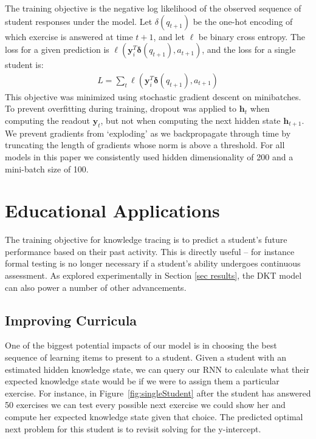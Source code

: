 \documentclass{article} \usepackage{nips,times}
\newcommand{\mb}{\mathbf}
\begin{document}
The training objective is the negative log likelihood of the observed sequence of student responses under the model. Let $\delta(q_{t+1})$ be the one-hot encoding of which exercise is answered at time $t+1$, and let $\ell$ be binary cross entropy. The loss for a given prediction is $\ell(\mb y_i^T \mb \delta\left(q_{t+1}\right), a_{t+1})$, and the loss for a single student is:
 \begin{equation}
   \begin{aligned}
         L = \sum_{t}\ell(\mb y_i^T \mb \delta\left(q_{t+1}\right), a_{t+1})
   \end{aligned}
 \end{equation}
This objective was minimized using stochastic gradient descent on minibatches.
To prevent overfitting during training, dropout was applied to $\mb h_t$ when computing the readout $\mb y_t$, but not when computing the next hidden state $\mb h_{t+1}$.
We prevent gradients from `exploding' as we backpropagate through time by truncating the length of gradients whose norm is above a threshold. For all models in this paper we consistently used hidden dimensionality of 200 and a mini-batch size of 100. 





\section{Educational Applications}

The training objective for knowledge tracing is to predict a student's future performance based on their past activity.
This is directly useful -- for instance formal testing is no longer necessary if a student's ability undergoes continuous assessment.
As explored experimentally in Section \ref{sec results},
the DKT model can also power a number of other advancements.


\subsection{Improving Curricula}

One of the biggest potential impacts of our model is in choosing the best sequence of learning items to present to a student. 
Given a student with an estimated hidden knowledge state, we can query our RNN to calculate what their expected knowledge state would be if we were to assign them a particular exercise.
For instance, in Figure~\ref{fig:singleStudent} after the student has answered 50 exercises we can test every possible next exercise we could show her and compute her expected knowledge state given that choice.
The predicted optimal next problem for this student is to revisit solving for the y-intercept.
\end{document}
